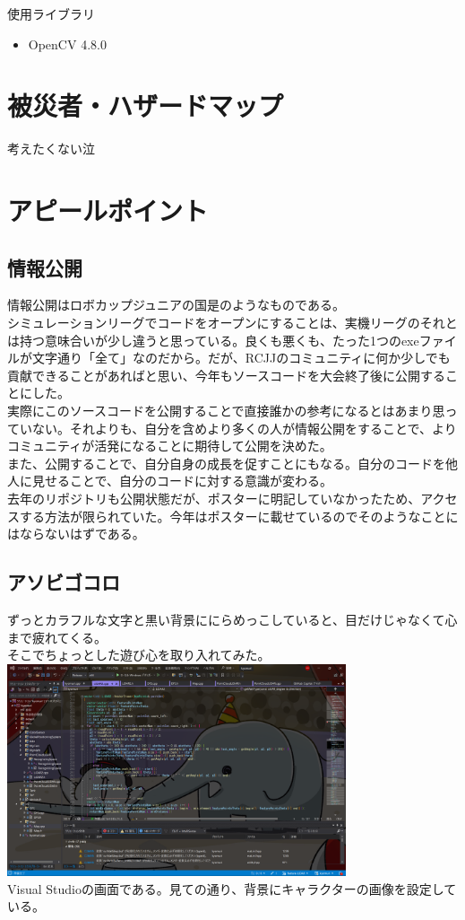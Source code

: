 \documentclass[uplatex,dvipdfmx,a4paper]{jsarticle}
\begin{document}
  \noindent
  使用ライブラリ
  \begin{itemize}
    \item OpenCV 4.8.0
  \end{itemize}

  \section{被災者・ハザードマップ}
  考えたくない泣

  \section{アピールポイント}
    \subsection{情報公開}
    情報公開はロボカップジュニアの国是のようなものである。\\
    シミュレーションリーグでコードをオープンにすることは、実機リーグのそれとは持つ意味合いが少し違うと思っている。良くも悪くも、たった1つのexeファイルが文字通り「全て」なのだから。だが、RCJJのコミュニティに何か少しでも貢献できることがあればと思い、今年もソースコードを大会終了後に公開することにした。\\
    実際にこのソースコードを公開することで直接誰かの参考になるとはあまり思っていない。それよりも、自分を含めより多くの人が情報公開をすることで、よりコミュニティが活発になることに期待して公開を決めた。\\
    また、公開することで、自分自身の成長を促すことにもなる。自分のコードを他人に見せることで、自分のコードに対する意識が変わる。\\

    去年のリポジトリも公開状態だが、ポスターに明記していなかったため、アクセスする方法が限られていた。今年はポスターに載せているのでそのようなことにはならないはずである。\\
    

    \subsection{アソビゴコロ}
    ずっとカラフルな文字と黒い背景ににらめっこしていると、目だけじゃなくて心まで疲れてくる。\\
    そこでちょっとした遊び心を取り入れてみた。\\
    \includegraphics[width=100mm]{Photo/photo0.png}\\
    Visual Studioの画面である。見ての通り、背景にキャラクターの画像を設定している。\\
\end{document}
